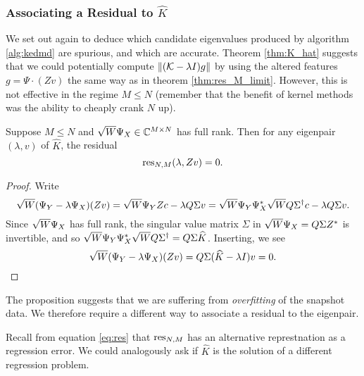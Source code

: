 
\subsubsection{Associating a Residual to $\widehat{K}$}

We set out again to deduce which candidate eigenvalues produced by algorithm 
\ref{alg:kedmd} are spurious, and which are accurate. Theorem \ref{thm:K_hat} suggests 
that we could potentially compute $\| (\mathcal{K} - \lambda I) g \|$ by using the altered 
features $g = \Psi \cdot (Z v)$ the same way as in theorem \ref{thm:res_M_limit}. However, 
this is not effective in the regime $M \leq N$ (remember that the benefit of kernel 
methods was the ability to cheaply crank $N$ up). 

\begin{proposition}
    Suppose $M \leq N$ and $\sqrt{W} \Psi_X \in \mathbb{C}^{M \times N}$ has full rank. Then 
    for any eigenpair $(\lambda, v)$ of $\widehat{K}$, the residual
    \begin{equation}
        \text{res}_{N,M} (\lambda, Z v) = 0 . 
    \end{equation}
\end{proposition}

\begin{proof}
    Write
    \begin{equation}
        \sqrt{W} (\Psi_Y - \lambda \Psi_X) (Z v) 
        = \sqrt{W} \Psi_Y Z c - \lambda Q \Sigma v
        = \sqrt{W} \Psi_Y \Psi_X^* \sqrt{W} Q \Sigma^\dagger c - \lambda Q \Sigma v . 
    \end{equation}
    Since $\sqrt{W} \Psi_X$ has full rank, the singular value matrix $\Sigma$ in 
    $\sqrt{W} \Psi_X = Q \Sigma Z^*$ is invertible, and so 
    $\sqrt{W} \Psi_Y \Psi_X^* \sqrt{W} Q \Sigma^\dagger = Q \Sigma \widehat{K}$. Inserting, we see 
    \begin{equation}
        \sqrt{W} (\Psi_Y - \lambda \Psi_X) (Z v) = Q \Sigma (\widehat{K} - \lambda I) v = 0 .  
    \end{equation}
\end{proof}

The proposition suggests that we are suffering from \emph{overfitting} of the snapshot 
data. We therefore require a different way to associate a residual to the eigenpair. 

Recall from equation \ref{eq:res} that $\text{res}_{N,M}$ has an alternative represtnation as 
a regression error. We could analogously ask if $\widehat{K}$ is the solution of a different 
regression problem. 

